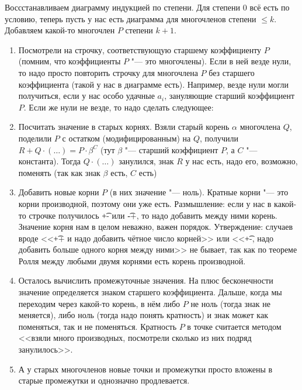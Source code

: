 	Воссстанавливаем диаграмму индукцией по степени.
	Для степени $0$ всё есть по условию, теперь пусть у нас есть диаграмма для многочленов степени $\le k$.
	Добавляем какой-то многочлен $P$ степени $k+1$.
	\begin{enumerate}
	\item
		Посмотрели на строчку, соответствующую старшему коэффициенту $P$ (помним, что коэффициенты $P$ "--- это многочлены).
		Если в ней везде нули, то надо просто повторить строчку для многочлена $P$ без старшего коэффициента (такой у нас в диаграмме есть).
		Например, везде нули могли получиться, если у нас особо удачные $a_i$, зануляющие старший коэффициент $P$.
		Если же нули не везде, то надо сделать следующее:
	\item
		Посчитать значение в старых корнях.
		Взяли старый корень $\alpha$ многочлена $Q$, поделили $P$ с остатком (модифицированным) на $Q$,
		получили $R+Q\cdot (\dots)=P\cdot \beta^C$ (тут $\beta$ "--- старший коэффициент $P$, а $C$ "--- константа).
		Тогда $Q\cdot (\dots)$ занулился, знак $R$ у нас есть, надо его, возможно, поменять (так как знак $\beta$ есть, $C$ есть)
	\item
		Добавить новые корни $P$ (в них значение "--- ноль).
		Кратные корни "--- это корни производной, поэтому они уже есть.
		Размышление: если у нас в какой-то строчке получилось \t{+-} или \t{-+}, то надо добавить между ними корень.
		Значение корня нам в целом неважно, важен порядок.
		Утверждение: случаев вроде <<\t{++} и надо добавить чётное число корней>> или <<\t{+-}, надо добавить больше одного корня между ними>> не бывает,
		так как по теореме Ролля между любыми двумя корнями есть корень производной.
	\item
		Осталось вычислить промежуточные значения.
		На плюс бесконечности значение определяется знаком старшего коэффициента.
		Дальше, когда мы переходим через какой-то корень, в нём либо $P$ не ноль (тогда знак не меняется),
		либо ноль (тогда надо понять кратность) и знак может как поменяться, так и не поменяться.
		Кратность $P$ в точке считается методом <<взяли много производных, посмотрели сколько из них подряд занулилось>>.
	\item
		А у старых многочленов новые точки и промежутки просто вложены в старые промежутки и однозначно продлевается.
	\end{enumerate}
